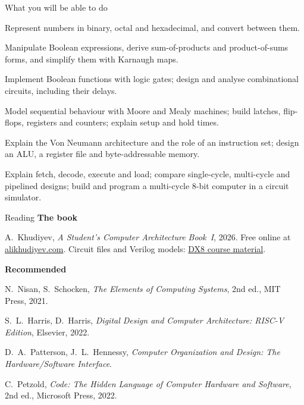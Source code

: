 \documentclass[10pt]{wosm-slides}
\begin{document}
\begin{frame}{What you will be able to do}
  \small
  \begin{description}[LO6]
    \item[LO1] Represent numbers in binary, octal and hexadecimal, and convert
      between them.
    \item[LO2] Manipulate Boolean expressions, derive sum-of-products and
      product-of-sums forms, and simplify them with Karnaugh maps.
    \item[LO3] Implement Boolean functions with logic gates; design and analyse
      combinational circuits, including their delays.
    \item[LO4] Model sequential behaviour with Moore and Mealy machines; build
      latches, flip-flops, registers and counters; explain setup and hold times.
    \item[LO5] Explain the Von Neumann architecture and the role of an instruction
      set; design an ALU, a register file and byte-addressable memory.
    \item[LO6] Explain fetch, decode, execute and load; compare single-cycle,
      multi-cycle and pipelined designs; build and program a multi-cycle 8-bit
      computer in a circuit simulator.
  \end{description}
\end{frame}

\begin{frame}{Reading}
  \textbf{The book}\par\smallskip
  A.\ Khudiyev, \emph{A Student's Computer Architecture Book~I}, 2026. Free online
  at
  \href{https://alikhudiyev.com/courses/self-study/computer-architecture/tutorial/book/2026/05/12/computer-architecture-1.html}{alikhudiyev.com}.
  Circuit files and Verilog models:
  \href{https://github.com/AliKhudiyev/alikhudiyev.github.io/tree/main/assets/courses/comp-arch}{DX8 course material}.\par
  \smallskip

  \bigskip
  \textbf{Recommended}\par\smallskip
  \small
  N.\ Nisan, S.\ Schocken, \emph{The Elements of Computing Systems}, 2nd ed., MIT
  Press, 2021.\par\smallskip
  S.\ L.\ Harris, D.\ Harris, \emph{Digital Design and Computer Architecture:
  RISC-V Edition}, Elsevier, 2022.\par\smallskip
  D.\ A.\ Patterson, J.\ L.\ Hennessy, \emph{Computer Organization and Design: The
  Hardware/Software Interface}.\par\smallskip
  C.\ Petzold, \emph{Code: The Hidden Language of Computer Hardware and Software},
  2nd ed., Microsoft Press, 2022.
\end{frame}
\end{document}
